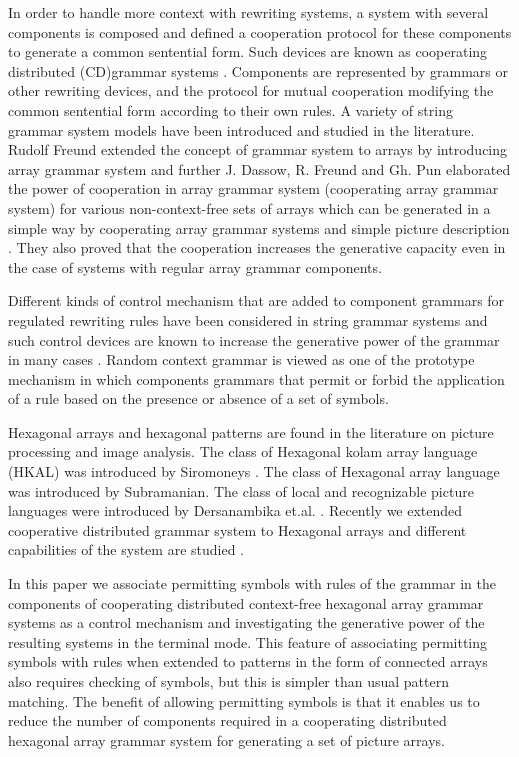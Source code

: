 \documentclass[11pt]{article}
\begin{document}
In order to handle more context with rewriting systems, a system
with several components is composed and defined a cooperation
protocol for these components to generate a common sentential
form. Such devices are known as cooperating distributed
(CD)grammar systems \cite{3}. Components are represented by
grammars or other rewriting devices, and the protocol for mutual
cooperation modifying the common sentential form  according to
their own rules. A variety of string grammar system models
\cite{3} have been introduced and studied in the literature.
Rudolf Freund extended the concept of grammar system to arrays
\cite{2} by introducing array grammar system and further J.
Dassow, R. Freund and Gh. Pun elaborated the power of
cooperation in array grammar system  (cooperating array grammar
system) for various non-context-free sets of arrays which can be
generated in a simple way by cooperating array grammar systems and
simple picture description \cite{1}. They also proved that the
cooperation increases the generative capacity even in the case of
systems with regular array grammar components.

Different kinds of control mechanism that are added to component
grammars for regulated rewriting rules have been considered in
string grammar systems and such control devices are known to
increase the generative power of the grammar in many cases
\cite{1}. Random context grammar is viewed as one of the prototype
mechanism in which components grammars that permit or forbid the
application of a rule based on  the presence or absence of a set
of symbols.

Hexagonal arrays and hexagonal patterns are found in the
literature on picture processing and image analysis. The class of
Hexagonal kolam array language (HKAL) was introduced by Siromoneys
\cite{9}. The class of Hexagonal array language was introduced by
Subramanian. The class of local and recognizable picture languages
were introduced  by Dersanambika et.al. \cite{6}. Recently we
extended cooperative distributed grammar system to Hexagonal
arrays and different capabilities of the system are studied
\cite{8}.

In this paper we associate permitting symbols with rules of the
grammar in the components of cooperating distributed context-free
hexagonal array grammar systems as a control mechanism and
investigating the generative power of the resulting systems in the
terminal mode. This feature of associating permitting symbols with
rules when extended to patterns in the form of connected arrays
also requires checking of symbols, but this is simpler than usual
pattern matching. The benefit of allowing permitting symbols is
that it enables us to reduce the number of components required in
a cooperating distributed hexagonal array grammar system for
generating a set of picture arrays.
\end{document}
